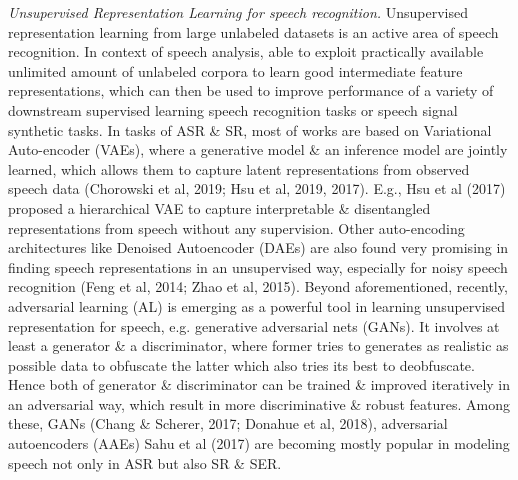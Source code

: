 \documentclass{article}
\begin{document}
\begin{itemize}
\begin{itemize}
\begin{itemize}
            {\it Unsupervised Representation Learning for speech recognition.} Unsupervised representation learning from large unlabeled datasets is an active area of speech recognition. In context of speech analysis, able to exploit practically available unlimited amount of unlabeled corpora to learn good intermediate feature representations, which can then be used to improve performance of a variety of downstream supervised learning speech recognition tasks or speech signal synthetic tasks. In tasks of ASR \& SR, most of works are based on Variational Auto-encoder (VAEs), where a generative model \& an inference model are jointly learned, which allows them to capture latent representations from observed speech data (Chorowski et al, 2019; Hsu et al, 2019, 2017). E.g., Hsu et al (2017) proposed a hierarchical VAE to capture interpretable \& disentangled representations from speech without any supervision. Other auto-encoding architectures like Denoised Autoencoder (DAEs) are also found very promising in finding speech representations in an unsupervised way, especially for noisy speech recognition (Feng et al, 2014; Zhao et al, 2015). Beyond aforementioned, recently, adversarial learning (AL) is emerging as a powerful tool in learning unsupervised representation for speech, e.g. generative adversarial nets (GANs). It involves at least a generator \& a discriminator, where former tries to generates as realistic as possible data to obfuscate the latter which also tries its best to deobfuscate. Hence both of generator \& discriminator can be trained \& improved iteratively in an adversarial way, which result in more discriminative \& robust features. Among these, GANs (Chang \& Scherer, 2017; Donahue et al, 2018), adversarial autoencoders (AAEs) Sahu et al (2017) are becoming mostly popular in modeling speech not only in ASR but also SR \& SER.


\end{itemize}
\end{itemize}
\end{itemize}
\end{document}
